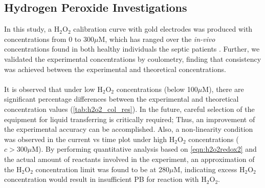 \subsection{Hydrogen Peroxide Investigations}
In this study, a H$_{\text{2}}$O$_{\text{2}}$ calibration curve with gold electrodes was produced with concentrations from 0 to 300$\mu$M, which has ranged over the \textit{in-vivo} concentrations found in both healthy individuals the septic patients \cite{FORMAN201648, VanAsbeck1995}. Further, we validated the experimental concentrations by coulometry, finding that consistency was achieved between the experimental and theoretical concentrations.\\\\
It is observed that under low H$_{\text{2}}$O$_{\text{2}}$ concentrations (below 100$\mu$M), there are significant percentage differences between the experimental and theoretical concentration values (\autoref{tab:h2o2_col_res}). In the future, careful selection of the equipment for liquid transferring is critically required; Thus, an improvement of the experimental accuracy can be accomplished. Also, a non-linearity condition was observed in the current vs time plot under high H$_{\text{2}}$O$_{\text{2}}$ concentrations ($c>300$$\mu$M). By performing quantitative analysis based on \autoref{eqn:h2o2redox2} and the actual amount of reactants involved in the experiment, an approximation of the H$_{\text{2}}$O$_{\text{2}}$ concentration limit was found to be at 280$\mu$M, indicating excess H$_{\text{2}}$O$_{\text{2}}$ concentration would result in insufficient PB for reaction with H$_{\text{2}}$O$_{\text{2}}$. 


